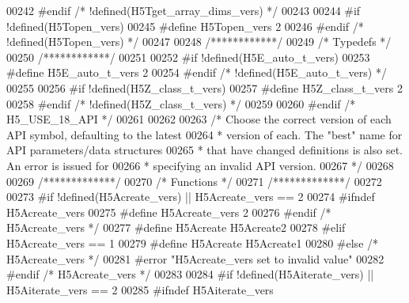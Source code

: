 \begin{DoxyCode}
00242 \textcolor{preprocessor}{#endif }\textcolor{comment}{/* !defined(H5Tget\_array\_dims\_vers) */}\textcolor{preprocessor}{}
00243 
00244 \textcolor{preprocessor}{#if !defined(H5Topen\_vers)}
00245 \textcolor{preprocessor}{  #define H5Topen\_vers 2}
00246 \textcolor{preprocessor}{#endif }\textcolor{comment}{/* !defined(H5Topen\_vers) */}\textcolor{preprocessor}{}
00247 
00248 \textcolor{comment}{/************/}
00249 \textcolor{comment}{/* Typedefs */}
00250 \textcolor{comment}{/************/}
00251 
00252 \textcolor{preprocessor}{#if !defined(H5E\_auto\_t\_vers)}
00253 \textcolor{preprocessor}{  #define H5E\_auto\_t\_vers 2}
00254 \textcolor{preprocessor}{#endif }\textcolor{comment}{/* !defined(H5E\_auto\_t\_vers) */}\textcolor{preprocessor}{}
00255 
00256 \textcolor{preprocessor}{#if !defined(H5Z\_class\_t\_vers)}
00257 \textcolor{preprocessor}{  #define H5Z\_class\_t\_vers 2}
00258 \textcolor{preprocessor}{#endif }\textcolor{comment}{/* !defined(H5Z\_class\_t\_vers) */}\textcolor{preprocessor}{}
00259 
00260 \textcolor{preprocessor}{#endif }\textcolor{comment}{/* H5\_USE\_18\_API */}\textcolor{preprocessor}{}
00261 
00262 
00263 \textcolor{comment}{/* Choose the correct version of each API symbol, defaulting to the latest}
00264 \textcolor{comment}{ *      version of each.  The "best" name for API parameters/data structures}
00265 \textcolor{comment}{ *      that have changed definitions is also set.  An error is issued for}
00266 \textcolor{comment}{ *      specifying an invalid API version.}
00267 \textcolor{comment}{ */}
00268 
00269 \textcolor{comment}{/*************/}
00270 \textcolor{comment}{/* Functions */}
00271 \textcolor{comment}{/*************/}
00272 
00273 \textcolor{preprocessor}{#if !defined(H5Acreate\_vers) || H5Acreate\_vers == 2}
00274 \textcolor{preprocessor}{  #ifndef H5Acreate\_vers}
00275 \textcolor{preprocessor}{    #define H5Acreate\_vers 2}
00276 \textcolor{preprocessor}{  #endif }\textcolor{comment}{/* H5Acreate\_vers */}\textcolor{preprocessor}{}
00277 \textcolor{preprocessor}{  #define H5Acreate H5Acreate2}
00278 \textcolor{preprocessor}{#elif H5Acreate\_vers == 1}
00279 \textcolor{preprocessor}{  #define H5Acreate H5Acreate1}
00280 \textcolor{preprocessor}{#else }\textcolor{comment}{/* H5Acreate\_vers */}\textcolor{preprocessor}{}
00281 \textcolor{preprocessor}{  #error "H5Acreate\_vers set to invalid value"}
00282 \textcolor{preprocessor}{#endif }\textcolor{comment}{/* H5Acreate\_vers */}\textcolor{preprocessor}{}
00283 
00284 \textcolor{preprocessor}{#if !defined(H5Aiterate\_vers) || H5Aiterate\_vers == 2}
00285 \textcolor{preprocessor}{  #ifndef H5Aiterate\_vers}

\end{DoxyCode}
